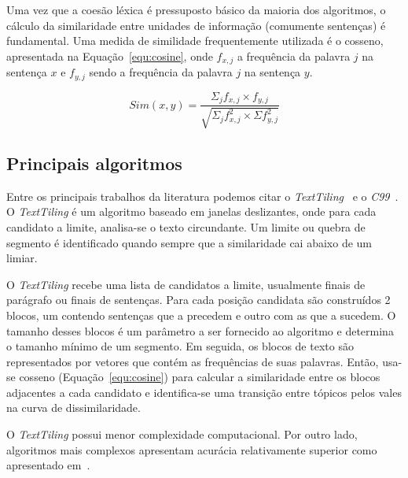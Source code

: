 Uma vez que a coesão léxica é pressuposto básico da maioria dos algoritmos, o cálculo da similaridade entre unidades de informação (comumente sentenças) é fundamental. Uma medida de similidade frequentemente utilizada é o cosseno, apresentada na Equação~\ref{equ:cosine}, onde $f_{x,j}$ a frequência da palavra $j$ na sentença $x$ e $f_{y,j}$ sendo a frequência da palavra $j$ na sentença $y$.


\begin{equation}
Sim(x,y) = \frac
{\Sigma_j f_{x,j} \times f_{y,j}}
{\sqrt{\Sigma_j f^2_{x,j} \times \Sigma f^2_{y,j}}}
\label{equ:cosine}
\end{equation}


\subsection{Principais algoritmos}
	\label{subsec:principaisalgoritimos}

Entre os principais trabalhos da literatura podemos citar o  \textit{TextTiling}~\cite{Hearst1994} e o \textit{C99}~\cite{Choi2000}.
%
O \textit{TextTiling} é um algoritmo baseado em janelas deslizantes, onde para cada candidato a limite, analisa-se o texto circundante. Um limite ou quebra de segmento é identificado quando sempre que a similaridade cai abaixo de um limiar.


O \textit{TextTiling} recebe uma lista de candidatos a limite, usualmente finais de parágrafo ou finais de sentenças. Para cada posição candidata são construídos 2 blocos, um contendo sentenças que a precedem e outro com as que a sucedem. O tamanho desses blocos é um parâmetro a ser fornecido ao algoritmo e determina o tamanho mínimo de um segmento.
%
Em seguida, os blocos de texto são representados por vetores que contém as frequências de suas palavras. Então, usa-se cosseno (Equação~\ref{equ:cosine}) para calcular a similaridade entre os blocos adjacentes a cada candidato e identifica-se uma transição entre tópicos pelos vales na curva de dissimilaridade.



O \textit{TextTiling} possui menor complexidade computacional. Por outro lado, algoritmos mais complexos apresentam acurácia relativamente superior como apresentado em~\cite{Choi2000, Kern2009, Misra2009}.




